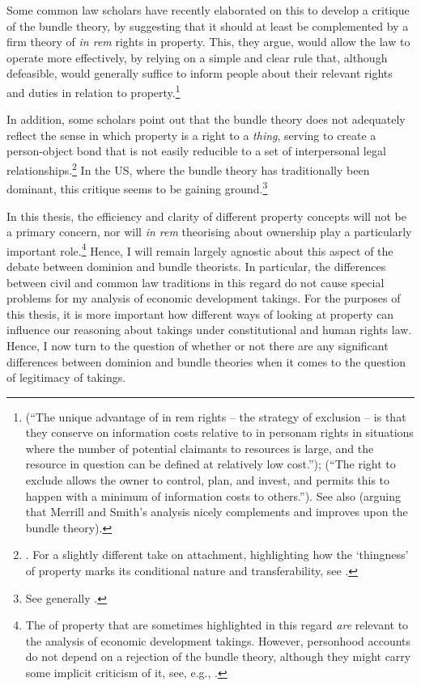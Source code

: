 Some common law scholars have recently elaborated on this to develop a critique of the bundle theory, by suggesting that it should at least be complemented by a firm theory of {\it in rem} rights in property. This, they argue, would allow the law to operate more effectively, by relying on a simple and clear rule that, although defeasible, would generally suffice to inform people about their relevant rights and duties in relation to property.\footnote{\cite[793]{merrill01b} (``The unique advantage of in rem rights -- the strategy of exclusion -- is that they conserve on information costs relative to in personam rights in situations where the number of potential claimants to resources is large, and the resource in question can be defined at relatively low cost.''); \cite[389]{merrill01} (``The right to exclude allows the owner to control, plan, and invest, and permits this to happen with a minimum of information costs to others.''). See also \cite{ellickson11} (arguing that Merrill and Smith's analysis nicely complements and improves upon the bundle theory).} 

In addition, some scholars point out that the bundle theory does not adequately reflect the sense in which property is a right to a {\it thing}, serving to create a person-object bond that is not easily reducible to a set of interpersonal legal relationships.\footnote{\cite[1862]{merrill07}. For a slightly different take on attachment, highlighting how the `thingness' of property marks its conditional nature and transferability, see \cite[799-818]{penner96}.} In the US, where the bundle theory has traditionally been dominant, this critique seems to be gaining ground.\footnote{See generally \cite{klein11}.}

In this thesis, the efficiency and clarity of different property concepts will not be a primary concern, nor will {\it in rem} theorising about ownership play a particularly important role.\footnote{The  of property that are sometimes highlighted in this regard {\it are} relevant to the analysis of economic development takings. However, personhood accounts do not depend on a rejection of the bundle theory, although they might carry some implicit criticism of it, see, e.g., \cite[127-130]{radin93}.} Hence, I will remain largely agnostic about this aspect of the debate between dominion and bundle theorists. In particular, the differences between civil and common law traditions in this regard do not cause special problems for my analysis of economic development takings. For the purposes of this thesis, it is more important how different ways of looking at property can influence our reasoning about takings under constitutional and human rights law. Hence, I now turn to the question of whether or not there are any significant differences between dominion and bundle theories when it comes to the question of legitimacy of takings.

